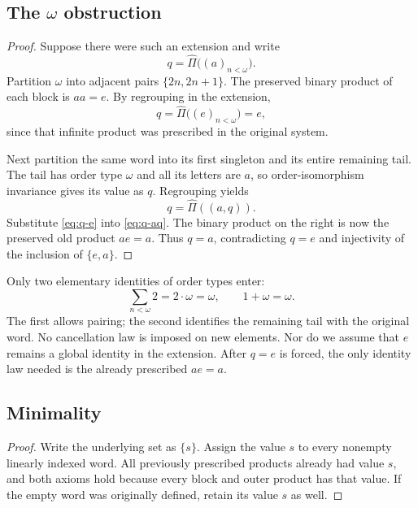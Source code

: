 \documentclass[11pt,letterpaper]{article}
\numberwithin{equation}{section}
\newtheorem{proposition}[theorem]{Proposition}
\theoremstyle{definition}
\theoremstyle{remark}
\newcommand{\set}[1]{\{#1\}}
\begin{document}
\subsection{The $\omega$ obstruction}
\begin{proof}
Suppose there were such an extension and write
\[
q=\widehat\Pi\bigl((a)_{n<\omega}\bigr).
\]
Partition $\omega$ into adjacent pairs $\set{2n,2n+1}$. The preserved binary product of each block is $aa=e$. By regrouping in the extension,
\begin{equation}\label{eq:q-e}
q=\widehat\Pi\bigl((e)_{n<\omega}\bigr)=e,
\end{equation}
since that infinite product was prescribed in the original system.

Next partition the same word into its first singleton and its entire remaining tail. The tail has order type $\omega$ and all its letters are $a$, so order-isomorphism invariance gives its value as $q$. Regrouping yields
\begin{equation}\label{eq:q-aq}
q=\widehat\Pi((a,q)).
\end{equation}
Substitute \eqref{eq:q-e} into \eqref{eq:q-aq}. The binary product on the right is now the preserved old product $ae=a$. Thus $q=a$, contradicting $q=e$ and injectivity of the inclusion of $\set{e,a}$.
\end{proof}

Only two elementary identities of order types enter:
\begin{equation}\label{eq:ordinal-identities}
\sum_{n<\omega}2=2\cdot\omega=\omega,
\qquad 1+\omega=\omega.
\end{equation}
The first allows pairing; the second identifies the remaining tail with the original word. No cancellation law is imposed on new elements. Nor do we assume that $e$ remains a global identity in the extension. After $q=e$ is forced, the only identity law needed is the already prescribed $ae=a$.

\subsection{Minimality}
\begin{proof}
Write the underlying set as $\set{s}$. Assign the value $s$ to every nonempty linearly indexed word. All previously prescribed products already had value $s$, and both axioms hold because every block and outer product has that value. If the empty word was originally defined, retain its value $s$ as well.
\end{proof}
\end{document}
